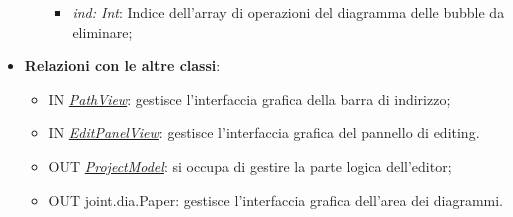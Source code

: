 \documentclass[../DefinizioneDiProdotto.tex]{subfiles}
\begin{document}
\begin{itemize}
\begin{itemize}
\begin{itemize}
								\item \emph{ind: Int}: Indice dell'array di operazioni del diagramma delle bubble da eliminare;
							\end{itemize}
						\end{itemize}
						\item \textbf{Relazioni con le altre classi}:
						\begin{itemize}
							\item IN \hyperlink{SWEDesigner::View::PathView}{\emph{PathView}}: gestisce l'interfaccia grafica della barra di indirizzo;
							\item IN \hyperlink{SWEDesigner::View::EditPanelView}{\emph{EditPanelView}}: gestisce l'interfaccia grafica del pannello di editing.
							\item OUT \hyperlink{SWEDesigner::Model::ProjectModel}{\emph{ProjectModel}}: si occupa di gestire la parte logica dell'editor;
							\item OUT joint.dia.Paper: gestisce l'interfaccia grafica dell'area dei diagrammi.
						\end{itemize}
					\end{itemize}
					
\end{document}
